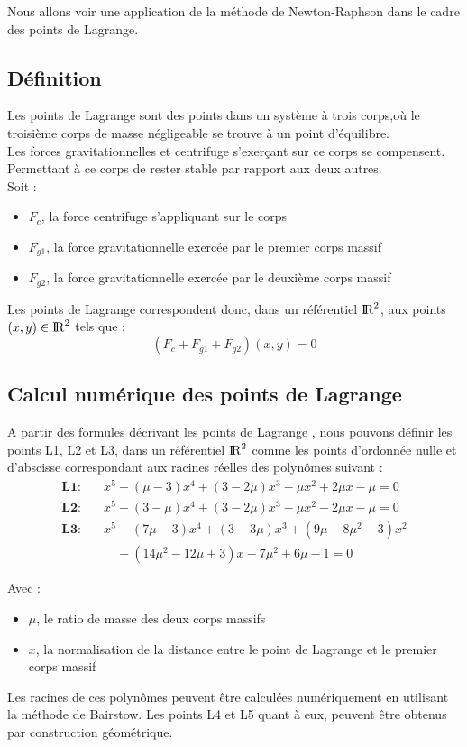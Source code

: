 Nous allons voir une application de la méthode de Newton-Raphson dans le cadre des points de Lagrange.
\subsection{Définition }
Les points de Lagrange sont des points dans un système à trois corps,où le troisième corps de masse négligeable se trouve à un point d'équilibre.\\
Les forces gravitationnelles et centrifuge s'exerçant sur ce corps se compensent. Permettant à ce corps de rester stable par rapport aux deux autres.\\
Soit : 
\begin{itemize}
  \item $F_c$, la force centrifuge s'appliquant sur le corps
  \item $F_{g1}$, la force gravitationnelle exercée par le premier corps massif
  \item $F_{g2}$, la force gravitationnelle exercée par le deuxième corps massif
\end{itemize}
Les points de Lagrange correspondent donc, dans un référentiel $\mathrm{I\!R}^2$, aux points $(x,y) \in \mathrm{I\!R}^2$ tels que :
\[
 (F_c + F_{g1} + F_{g2})(x,y) = 0
\]
\subsection{Calcul numérique des points de Lagrange}
A partir des formules décrivant les points de Lagrange \cite{lagrandian_points_formule},  nous pouvons définir les points {L1, L2} et {L3}, dans un référentiel $\mathrm{I\!R}^2$ comme les points d'ordonnée nulle et d'abscisse correspondant aux racines réelles des polynômes suivant :\\
\begin{align*}
\textbf{L1:} \quad & x^5 + (\mu - 3)x^4 + (3 - 2\mu)x^3 - \mu x^2 + 2\mu x - \mu = 0 \\
\textbf{L2:} \quad & x^5 + (3 - \mu)x^4 + (3 - 2\mu)x^3 - \mu x^2 - 2\mu x - \mu = 0 \\
\textbf{L3:} \quad & x^5 + (7\mu - 3)x^4 + (3 - 3\mu)x^3 + (9\mu - 8\mu^2 - 3)x^2 \\
                  & \quad + (14\mu^2 - 12\mu + 3)x - 7\mu^2 + 6\mu - 1 = 0
\end{align*}

Avec :
\begin{itemize}
  \item{$\mu$, le ratio de masse des deux corps massifs}
  \item{$x$, la normalisation de la distance entre le point de Lagrange et le premier corps massif}
\end{itemize}
Les racines de ces polynômes peuvent être calculées numériquement en utilisant la méthode de Bairstow.
Les points {L4} et {L5} quant à eux, peuvent être obtenus par construction géométrique.

